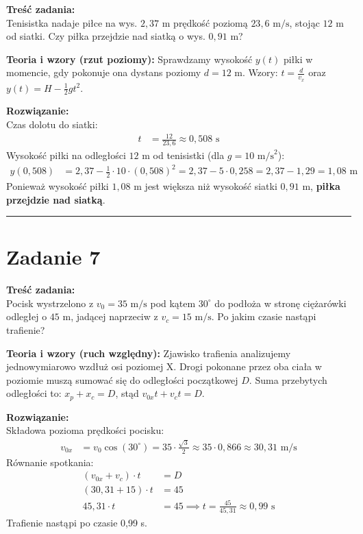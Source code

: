 \documentclass[11pt, a4paper]{article}
\begin{document}
\textbf{Treść zadania:} \\
Tenisistka nadaje piłce na wys. $2,37 \text{ m}$ prędkość poziomą $23,6 \text{ m/s}$, stojąc $12 \text{ m}$ od siatki. Czy piłka przejdzie nad siatką o wys. $0,91 \text{ m}$?

\textbf{Teoria i wzory (rzut poziomy):}
Sprawdzamy wysokość $y(t)$ piłki w momencie, gdy pokonuje ona dystans poziomy $d = 12 \text{ m}$.
Wzory: $t = \frac{d}{v_x}$ oraz $y(t) = H - \frac{1}{2}gt^2$.

\textbf{Rozwiązanie:} \\
Czas dolotu do siatki:
\begin{align*}
    t &= \frac{12}{23,6} \approx 0,508 \text{ s}
\end{align*}
Wysokość piłki na odległości $12 \text{ m}$ od tenisistki (dla $g=10 \text{ m/s}^2$):
\begin{align*}
    y(0,508) &= 2,37 - \frac{1}{2} \cdot 10 \cdot (0,508)^2 = 2,37 - 5 \cdot 0,258 = 2,37 - 1,29 = 1,08 \text{ m}
\end{align*}
Ponieważ wysokość piłki $1,08 \text{ m}$ jest większa niż wysokość siatki $0,91 \text{ m}$, \textbf{piłka przejdzie nad siatką}.

\vspace{0.5cm}
\hrule
\vspace{0.5cm}

\section*{Zadanie 7}

\textbf{Treść zadania:} \\
Pocisk wystrzelono z $v_0=35 \text{ m/s}$ pod kątem $30^\circ$ do podłoża w stronę ciężarówki odległej o $45 \text{ m}$, jadącej naprzeciw z $v_c=15 \text{ m/s}$. Po jakim czasie nastąpi trafienie?

\textbf{Teoria i wzory (ruch względny):}
Zjawisko trafienia analizujemy jednowymiarowo wzdłuż osi poziomej X. Drogi pokonane przez oba ciała w poziomie muszą sumować się do odległości początkowej $D$.
Suma przebytych odległości to: $x_p + x_c = D$, stąd $v_{0x}t + v_c t = D$.

\textbf{Rozwiązanie:} \\
Składowa pozioma prędkości pocisku:
\begin{align*}
    v_{0x} &= v_0 \cos(30^\circ) = 35 \cdot \frac{\sqrt{3}}{2} \approx 35 \cdot 0,866 \approx 30,31 \text{ m/s}
\end{align*}
Równanie spotkania:
\begin{align*}
    (v_{0x} + v_c) \cdot t &= D \\
    (30,31 + 15) \cdot t &= 45 \\
    45,31 \cdot t &= 45 \implies t = \frac{45}{45,31} \approx 0,99 \text{ s}
\end{align*}
Trafienie nastąpi po czasie 0,99 s.
\end{document}
